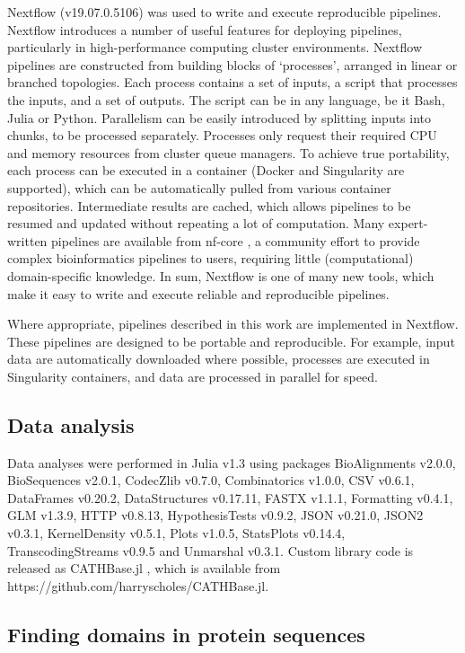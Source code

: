 Nextflow \cite{DITommaso2017} (v19.07.0.5106) was used to write and execute reproducible pipelines. Nextflow introduces a number of useful features for deploying pipelines, particularly in high-performance computing cluster environments. Nextflow pipelines are constructed from building blocks of `processes', arranged in linear or branched topologies. Each process contains a set of inputs, a script that processes the inputs, and a set of outputs. The script can be in any language, be it Bash, Julia or Python. Parallelism can be easily introduced by splitting inputs into chunks, to be processed separately. Processes only request their required CPU and memory resources from cluster queue managers. To achieve true portability, each process can be executed in a container (Docker and Singularity are supported), which can be automatically pulled from various container repositories. Intermediate results are cached, which allows pipelines to be resumed and updated without repeating a lot of computation. Many expert-written pipelines are available from nf-core \cite{Ewels2020}, a community effort to provide complex bioinformatics pipelines to users, requiring little (computational) domain-specific knowledge. In sum, Nextflow is one of many new tools, which make it easy to write and execute reliable and reproducible pipelines.

Where appropriate, pipelines described in this work are implemented in Nextflow. These pipelines are designed to be portable and reproducible. For example, input data are automatically downloaded where possible, processes are executed in Singularity containers, and data are processed in parallel for speed.

\subsection{Data analysis}

Data analyses were performed in Julia v1.3 \cite{Bezanson2012} using packages BioAlignments v2.0.0, BioSequences v2.0.1, CodecZlib v0.7.0, Combinatorics v1.0.0, CSV v0.6.1, DataFrames v0.20.2, DataStructures v0.17.11, FASTX v1.1.1, Formatting v0.4.1, GLM v1.3.9, HTTP v0.8.13, HypothesisTests v0.9.2, JSON v0.21.0, JSON2 v0.3.1, KernelDensity v0.5.1, Plots v1.0.5, StatsPlots v0.14.4, TranscodingStreams v0.9.5 and Unmarshal v0.3.1. Custom library code is released as CATHBase.jl \cite{Scholes2020}, which is available from https://github.com/harryscholes/CATHBase.jl.

\subsection{Finding domains in protein sequences}

